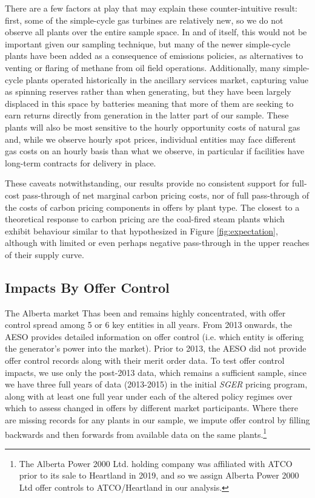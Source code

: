 \documentclass[12pt]{article}
\newcommand{\SGER}{\textit{SGER} }
\begin{document}

There are a few factors at play that may explain these counter-intuitive result: first, some of the simple-cycle gas turbines are relatively new, so we do not observe all plants over the entire sample space. In and of itself, this would not be important given our sampling technique, but many of the newer simple-cycle plants have been added as a consequence of emissions policies, as alternatives to venting or flaring of methane from oil field operations. Additionally, many simple-cycle plants operated historically in the ancillary services market, capturing value as spinning reserves rather than when generating, but they have been largely displaced in this space by batteries meaning that more of them are seeking to earn returns directly from generation in the latter part of our sample. These plants will also be most sensitive to the hourly opportunity costs of natural gas and, while we observe hourly spot prices, individual entities may face different gas costs on an hourly basis than what we observe, in particular if facilities have long-term contracts for delivery in place.

These caveats notwithstanding, our results provide no consistent support for full-cost pass-through of net marginal carbon pricing costs, nor of full pass-through of the costs of carbon pricing components in offers by plant type. The closest to a theoretical response to carbon pricing are the coal-fired steam plants which exhibit behaviour similar to that hypothesized in Figure \ref{fig:expectation}, although with limited or even perhaps negative pass-through in the upper reaches of their supply curve.

\subsection{Impacts By Offer Control}
The Alberta market Thas been and remains highly concentrated, with offer control spread among 5 or 6 key entities in all years. From 2013 onwards, the AESO provides detailed information on offer control (i.e. which entity is offering the generator's power into the market). Prior to 2013, the AESO did not provide offer control records along with their merit order data. To test offer control impacts, we use only the post-2013 data, which remains a sufficient sample, since we have three full years of data (2013-2015) in the initial \SGER pricing program, along with at least one full year under each of the altered policy regimes over which to assess changed in offers by different market participants. Where there are missing records for any plants in our sample, we impute offer control by filling backwards and then forwards from available data on the same plants.\footnote{The Alberta Power 2000 Ltd. holding company was affiliated with ATCO prior to its sale to Heartland in 2019, and so we assign Alberta Power 2000 Ltd offer controls to ATCO/Heartland in our analysis.}
\end{document}
